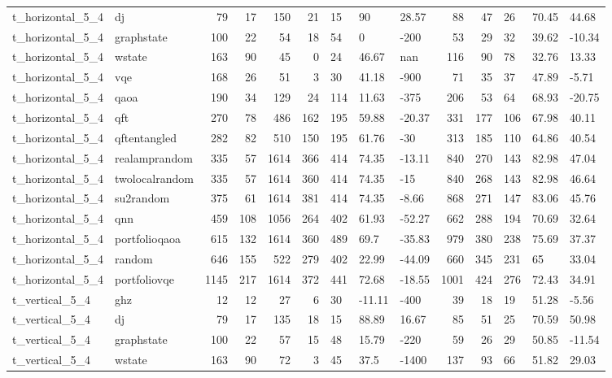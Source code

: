 \begin{longtable}{llrrrrlllrrlll}
t\_horizontal\_5\_4 & dj & 79 & 17 & 150 & 21 & 15 & 90 & 28.57 & 88 & 47 & 26 & 70.45 & 44.68 \\
t\_horizontal\_5\_4 & graphstate & 100 & 22 & 54 & 18 & 54 & 0 & -200 & 53 & 29 & 32 & 39.62 & -10.34 \\
t\_horizontal\_5\_4 & wstate & 163 & 90 & 45 & 0 & 24 & 46.67 & nan & 116 & 90 & 78 & 32.76 & 13.33 \\
t\_horizontal\_5\_4 & vqe & 168 & 26 & 51 & 3 & 30 & 41.18 & -900 & 71 & 35 & 37 & 47.89 & -5.71 \\
t\_horizontal\_5\_4 & qaoa & 190 & 34 & 129 & 24 & 114 & 11.63 & -375 & 206 & 53 & 64 & 68.93 & -20.75 \\
t\_horizontal\_5\_4 & qft & 270 & 78 & 486 & 162 & 195 & 59.88 & -20.37 & 331 & 177 & 106 & 67.98 & 40.11 \\
t\_horizontal\_5\_4 & qftentangled & 282 & 82 & 510 & 150 & 195 & 61.76 & -30 & 313 & 185 & 110 & 64.86 & 40.54 \\
t\_horizontal\_5\_4 & realamprandom & 335 & 57 & 1614 & 366 & 414 & 74.35 & -13.11 & 840 & 270 & 143 & 82.98 & 47.04 \\
t\_horizontal\_5\_4 & twolocalrandom & 335 & 57 & 1614 & 360 & 414 & 74.35 & -15 & 840 & 268 & 143 & 82.98 & 46.64 \\
t\_horizontal\_5\_4 & su2random & 375 & 61 & 1614 & 381 & 414 & 74.35 & -8.66 & 868 & 271 & 147 & 83.06 & 45.76 \\
t\_horizontal\_5\_4 & qnn & 459 & 108 & 1056 & 264 & 402 & 61.93 & -52.27 & 662 & 288 & 194 & 70.69 & 32.64 \\
t\_horizontal\_5\_4 & portfolioqaoa & 615 & 132 & 1614 & 360 & 489 & 69.7 & -35.83 & 979 & 380 & 238 & 75.69 & 37.37 \\
t\_horizontal\_5\_4 & random & 646 & 155 & 522 & 279 & 402 & 22.99 & -44.09 & 660 & 345 & 231 & 65 & 33.04 \\
t\_horizontal\_5\_4 & portfoliovqe & 1145 & 217 & 1614 & 372 & 441 & 72.68 & -18.55 & 1001 & 424 & 276 & 72.43 & 34.91 \\
t\_vertical\_5\_4 & ghz & 12 & 12 & 27 & 6 & 30 & -11.11 & -400 & 39 & 18 & 19 & 51.28 & -5.56 \\
t\_vertical\_5\_4 & dj & 79 & 17 & 135 & 18 & 15 & 88.89 & 16.67 & 85 & 51 & 25 & 70.59 & 50.98 \\
t\_vertical\_5\_4 & graphstate & 100 & 22 & 57 & 15 & 48 & 15.79 & -220 & 59 & 26 & 29 & 50.85 & -11.54 \\
t\_vertical\_5\_4 & wstate & 163 & 90 & 72 & 3 & 45 & 37.5 & -1400 & 137 & 93 & 66 & 51.82 & 29.03 \\

\end{longtable}

